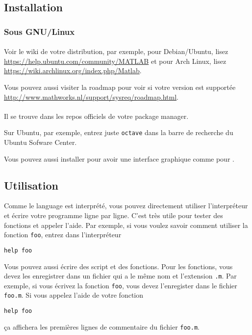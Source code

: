 \subsection{Installation}
\subsubsection{Sous GNU/Linux}
\paragraph{\matlab{}}
Voir le wiki de votre distribution, par exemple,
pour Debian/Ubuntu, lisez
\url{https://help.ubuntu.com/community/MATLAB} et pour
Arch Linux, lisez
\url{https://wiki.archlinux.org/index.php/Matlab}.

Vous pouvez aussi visiter la roadmap pour voir si votre version est
supportée \url{http://www.mathworks.nl/support/sysreq/roadmap.html}.

\paragraph{\octave{}}
Il se trouve dans les repos officiels de votre package manager.

Sur Ubuntu, par exemple, entrez juste \verb|octave| dans la barre de
recherche du Ubuntu Sofware Center.

Vous pouvez aussi installer \qtoctave{} pour avoir une interface graphique
comme pour \matlab.

\subsection{Utilisation}
Comme le language est interprété, vous pouvez directement
utiliser l'interpréteur et écrire votre programme ligne par ligne.
C'est très utile pour tester des fonctions et appeler l'aide.
Par exemple, si vous voulez savoir comment utiliser la fonction
\lstinline|foo|, entrez dans l'interpréteur
\begin{lstlisting}
help foo
\end{lstlisting}

Vous pouvez aussi écrire des script et des fonctions.
Pour les fonctions, vous devez les enregistrer dans un fichier
qui a le même nom et l'extension \verb|.m|.
Par exemple, si vous écrivez la fonction \lstinline|foo|, vous devez
l'enregister dans le fichier \verb|foo.m|.
Si vous appelez l'aide de votre fonction
\begin{lstlisting}
help foo
\end{lstlisting}
ça affichera les premières lignes de commentaire du fichier \verb|foo.m|.

